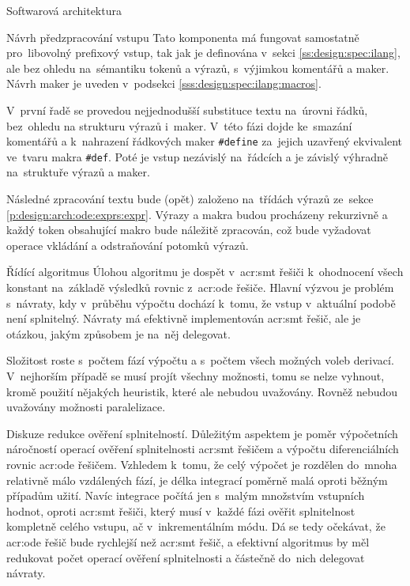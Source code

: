 \documentclass[thesis=M,czech]{FITthesis}[2012/06/26]
\newcommand{\acrlabel}[1]{acr:#1}
\newcommand{\acr}[1]{\acrshort{\acrlabel{#1}}}
\newcommand{\id}[1]{\texttt{#1}}
\newcommand{\rf}[1]{\ref{#1}}
\begin{document}
\begin{section}{Softwarová architektura}

\begin{subsection}{Návrh předzpracování vstupu}
\label{ss:design:arch:preprocess}
Tato komponenta má fungovat samostatně pro~libovolný prefixový vstup,
tak jak je definována v~sekci \rf{ss:design:spec:ilang},
ale bez ohledu na~sémantiku tokenů a výrazů,
s~výjimkou komentářů a maker.
Návrh maker je uveden v~podsekci \rf{sss:design:spec:ilang:macros}.

V~první řadě se provedou nejjednodušší substituce textu
na~úrovni řádků, bez~ohledu na strukturu výrazů i~maker.
V~této fázi dojde ke~smazání komentářů
a k~nahrazení řádkových maker \id{\#define}
za~jejich uzavřený ekvivalent ve~tvaru makra \id{\#def}.
Poté je vstup nezávislý na~řádcích
a je závislý výhradně na~struktuře výrazů a maker.

Následné zpracování textu bude (opět) založeno na~třídách výrazů
ze~sekce \rf{p:design:arch:ode:exprs:expr}.
Výrazy a makra budou procházeny rekurzivně
a každý token obsahující makro bude náležitě zpracován,
což bude vyžadovat operace vkládání a odstraňování potomků výrazů.
\end{subsection} %


\begin{subsection}{Řídící algoritmus}\label{ss:design:arch:alg}
Úlohou algoritmu je dospět v~\acr{smt} řešiči
k~ohodnocení všech konstant
na~základě výsledků rovnic z~\acr{ode} řešiče.
Hlavní výzvou je problém s~návraty,
kdy v~průběhu výpočtu dochází k~tomu,
že vstup v~aktuální podobě není splnitelný.
Návraty má efektivně implementován \acr{smt} řešič,
ale je otázkou, jakým způsobem je na~něj delegovat.

Složitost roste s~počtem fází výpočtu
a s~počtem všech možných voleb derivací.
V~nejhorším případě se musí projít všechny možnosti,
tomu se nelze vyhnout, kromě použití nějakých heuristik,
které ale nebudou uvažovány.
Rovněž nebudou uvažovány možnosti paralelizace.


\begin{paragraph}{Diskuze redukce ověření splnitelností.}
\label{ss:design:arch:alg:discuss}
Důležitým aspektem je poměr výpočetních náročností
operací ověření splnitelnosti \acr{smt} řešičem
a výpočtu diferenciálních rovnic \acr{ode} řešičem.
Vzhledem k~tomu, že celý výpočet je rozdělen
do~mnoha relativně málo vzdálených fází,
je délka integrací poměrně malá
oproti běžným případům užití.
Navíc integrace počítá jen s~malým množstvím
vstupních hodnot,
oproti \acr{smt} řešiči,
který musí v~každé fázi ověřit splnitelnost kompletně celého vstupu,
ač v~inkrementálním módu.
Dá se tedy očekávat,
že \acr{ode} řešič bude rychlejší než \acr{smt} řešič,
a efektivní algoritmus by měl redukovat
počet operací ověření splnitelnosti
a částečně do~nich delegovat návraty.


\end{paragraph}
\end{subsection}
\end{section}
\end{document}
